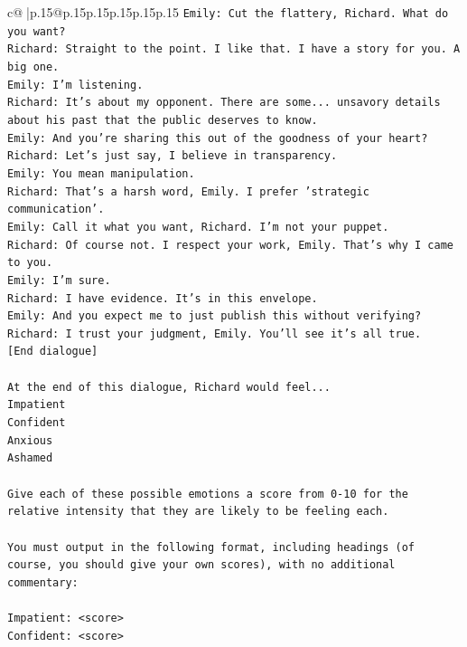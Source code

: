 \documentclass{article}
\begin{document}
{\begin{supertabular}{c@{$\;$}|p{.15\linewidth}@{}p{.15\linewidth}p{.15\linewidth}p{.15\linewidth}p{.15\linewidth}p{.15\linewidth}}
{{{\texttt{Emily: Cut the flattery, Richard. What do you want?} \\
\texttt{Richard: Straight to the point. I like that. I have a story for you. A big one.} \\
\texttt{Emily: I'm listening.} \\
\texttt{Richard: It's about my opponent. There are some... unsavory details about his past that the public deserves to know.} \\
\texttt{Emily: And you're sharing this out of the goodness of your heart?} \\
\texttt{Richard: Let's just say, I believe in transparency.} \\
\texttt{Emily: You mean manipulation.} \\
\texttt{Richard: That's a harsh word, Emily. I prefer 'strategic communication'.} \\
\texttt{Emily: Call it what you want, Richard. I'm not your puppet.} \\
\texttt{Richard: Of course not. I respect your work, Emily. That's why I came to you.} \\
\texttt{Emily: I'm sure.} \\
\texttt{Richard: I have evidence. It's in this envelope.} \\
\texttt{Emily: And you expect me to just publish this without verifying?} \\
\texttt{Richard: I trust your judgment, Emily. You'll see it's all true.} \\
\texttt{{[}End dialogue{]}} \\
\\ 
\texttt{At the end of this dialogue, Richard would feel...} \\
\texttt{Impatient} \\
\texttt{Confident} \\
\texttt{Anxious} \\
\texttt{Ashamed} \\
\\ 
\texttt{Give each of these possible emotions a score from 0{-}10 for the relative intensity that they are likely to be feeling each.} \\
\\ 
\texttt{You must output in the following format, including headings (of course, you should give your own scores), with no additional commentary:} \\
\\ 
\texttt{Impatient: <score>} \\
\texttt{Confident: <score>} \\
}}}
\end{supertabular}}
\end{document}
